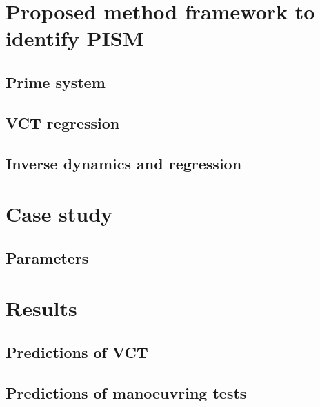 \documentclass[preprint,12pt,authoryear]{elsarticle}
\begin{document}
%
%
%
\section{Proposed method framework to identify PISM}
\label{sec:methodology}

\FloatBarrier
%
\subsection{Prime system}
\label{sec:prime_system}



\FloatBarrier

\subsection{VCT regression}
\label{sec:VCT_regression}

\FloatBarrier
%
\subsection{Inverse dynamics and regression}
\label{sec:inverse_dynamics}

\FloatBarrier
%
%
%
\section{Case study}
\label{sec:case_study}

\FloatBarrier
\subsection{Parameters}
\label{sec:parameters}


%
%
%
\section{Results}
\label{sec:results}

%
\subsection{Predictions of VCT}
\label{sec:result_VCT}

\FloatBarrier
%
\subsection{Predictions of manoeuvring tests}
\label{sec:result_MDL}

\FloatBarrier
%
\end{document}
